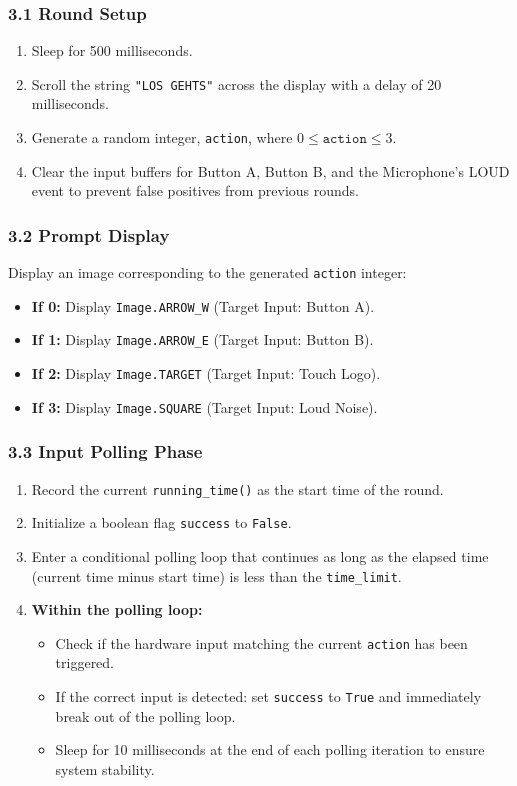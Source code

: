 \documentclass[12pt, a4paper]{article}
\begin{document}
\subsubsection*{3.1 Round Setup}
\begin{enumerate}
    \item Sleep for 500 milliseconds.
    \item Scroll the string \texttt{"LOS GEHTS"} across the display with a delay of 20 milliseconds.
    \item Generate a random integer, \texttt{action}, where $0 \le \texttt{action} \le 3$.
    \item Clear the input buffers for Button A, Button B, and the Microphone's LOUD event to prevent false positives from previous rounds.
\end{enumerate}

\subsubsection*{3.2 Prompt Display}
Display an image corresponding to the generated \texttt{action} integer:
\begin{itemize}
    \item \textbf{If 0:} Display \texttt{Image.ARROW\_W} (Target Input: Button A).
    \item \textbf{If 1:} Display \texttt{Image.ARROW\_E} (Target Input: Button B).
    \item \textbf{If 2:} Display \texttt{Image.TARGET} (Target Input: Touch Logo).
    \item \textbf{If 3:} Display \texttt{Image.SQUARE} (Target Input: Loud Noise).
\end{itemize}

\subsubsection*{3.3 Input Polling Phase}
\begin{enumerate}
    \item Record the current \texttt{running\_time()} as the start time of the round.
    \item Initialize a boolean flag \texttt{success} to \texttt{False}.
    \item Enter a conditional polling loop that continues as long as the elapsed time (current time minus start time) is less than the \texttt{time\_limit}.
    \item \textbf{Within the polling loop:}
    \begin{itemize}
        \item Check if the hardware input matching the current \texttt{action} has been triggered.
        \item If the correct input is detected: set \texttt{success} to \texttt{True} and immediately break out of the polling loop.
        \item Sleep for 10 milliseconds at the end of each polling iteration to ensure system stability.
    \end{itemize}
\end{enumerate}
\end{document}
